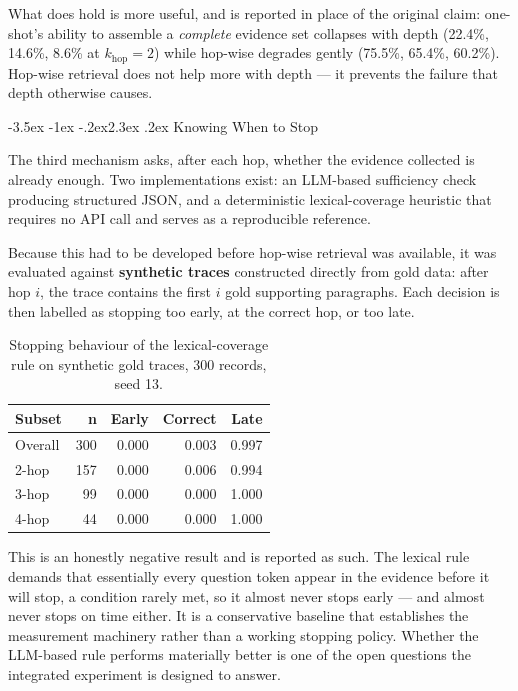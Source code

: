 \documentclass[11pt,a4paper]{article}
\makeatletter
\renewcommand\section{\@startsection{section}{1}{\z@}%
  {-3.5ex \@plus -1ex \@minus -.2ex}{2.3ex \@plus.2ex}%
  {\color{ink}\normalfont\Large\bfseries}}
\makeatother
\begin{document}
What does hold is more useful, and is reported in place of the original claim:
one-shot's ability to assemble a \emph{complete} evidence set collapses with
depth (22.4\%, 14.6\%, 8.6\% at $k_{\text{hop}}=2$) while hop-wise degrades
gently (75.5\%, 65.4\%, 60.2\%). Hop-wise retrieval does not help more with
depth --- it prevents the failure that depth otherwise causes.

\section{Knowing When to Stop}

The third mechanism asks, after each hop, whether the evidence collected is
already enough. Two implementations exist: an LLM-based sufficiency check
producing structured JSON, and a deterministic lexical-coverage heuristic that
requires no API call and serves as a reproducible reference.

Because this had to be developed before hop-wise retrieval was available, it was
evaluated against \textbf{synthetic traces} constructed directly from gold data:
after hop $i$, the trace contains the first $i$ gold supporting paragraphs. Each
decision is then labelled as stopping too early, at the correct hop, or too late.

\begin{table}[H]
\centering
\caption{Stopping behaviour of the lexical-coverage rule on synthetic gold
traces, 300 records, seed 13.}
\begin{tabular}{lrrrr}
\toprule
\textbf{Subset} & \textbf{n} & \textbf{Early} & \textbf{Correct} & \textbf{Late} \\
\midrule
Overall & 300 & 0.000 & 0.003 & 0.997 \\
2-hop   & 157 & 0.000 & 0.006 & 0.994 \\
3-hop   & 99  & 0.000 & 0.000 & 1.000 \\
4-hop   & 44  & 0.000 & 0.000 & 1.000 \\
\bottomrule
\end{tabular}
\end{table}

This is an honestly negative result and is reported as such. The lexical rule
demands that essentially every question token appear in the evidence before it
will stop, a condition rarely met, so it almost never stops early --- and almost
never stops on time either. It is a conservative baseline that establishes the
measurement machinery rather than a working stopping policy. Whether the
LLM-based rule performs materially better is one of the open questions the
integrated experiment is designed to answer.
\end{document}
